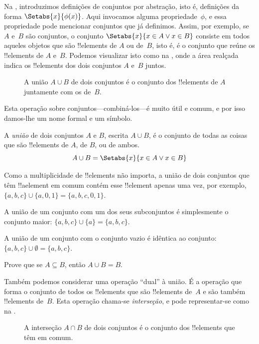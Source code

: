 \documentclass[../../../include/open-logic-section]{subfiles}
\begin{document}

\begin{explain}
Na , introduzimos definições de conjuntos por
abstração, isto é, definições da forma $\Setabs{x}{\phi(x)}$.
Aqui invocamos alguma propriedade~$\phi$, e essa propriedade pode mencionar
conjuntos que já definimos. Assim, por exemplo, se $A$ e~$B$ são conjuntos,
o conjunto $\Setabs{x}{x \in A \lor x \in B}$ consiste em todos aqueles
objetos que são !!{element}s de $A$ ou de~$B$, isto é, é o
conjunto que reúne os !!{element}s de $A$ e~$B$. Podemos visualizar
isto como na , onde a área realçada indica os
!!{element}s dos dois conjuntos $A$ e~$B$ juntos.

\begin{figure}[H]
  \caption{A união $A \cup B$ de dois conjuntos é o conjunto dos !!{element}s de
   $A$ juntamente com os de~$B$.}
\end{figure}

Esta operação sobre conjuntos---combiná-los---é muito útil e comum,
e por isso damos-lhe um nome formal e um símbolo. 
\end{explain}

\begin{defn}[União]
A \emph{união} de dois conjuntos $A$ e $B$, escrita $A \cup B$, é o
conjunto de todas as coisas que são !!{element}s de $A$, de $B$, ou de ambos.
\[
A \cup B = \Setabs{x}{x \in A \lor x \in B}
\]
\end{defn}

\begin{ex}
Como a multiplicidade de !!{element}s não importa, a união de dois
conjuntos que têm !!a{element} em comum contém esse !!{element} apenas uma vez,
por exemplo, $\{ a, b, c\} \cup \{ a, 0, 1\} = \{a, b, c, 0, 1\}$.

A união de um conjunto com um dos seus subconjuntos é simplesmente o conjunto maior: $\{a,
b, c \} \cup \{a \} = \{a, b, c\}$.

A união de um conjunto com o conjunto vazio é idêntica ao conjunto: $\{a,
b, c \} \cup \emptyset = \{a, b, c \}$.
\end{ex}

\begin{prob}
Prove que se $A \subseteq B$, então $A \cup B = B$.
\end{prob}

\begin{explain}
Também podemos considerar uma operação ``dual'' à união. É a
operação que forma o conjunto de todos os !!{element}s que são !!{element}s
de~$A$ e são também !!{element}s de~$B$. Esta operação chama-se
\emph{interseção}, e pode representar-se como na .
\begin{figure}[H]
  \caption{A interseção $A \cap B$ de dois conjuntos é o conjunto dos
    !!{element}s que têm em comum.}
\end{figure}
\end{explain}
\end{document}
